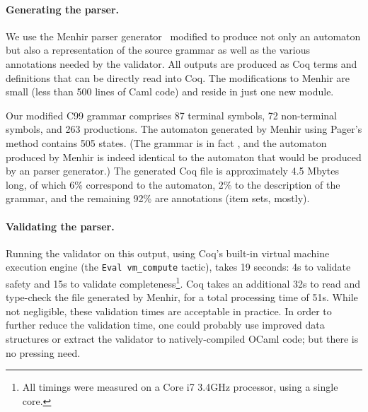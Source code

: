 \documentclass{llncs}
\begin{document}
\paragraph{Generating the parser.}  We use the Menhir parser
generator~\cite{menhir} modified to produce not only an \lrone
automaton but also a representation of the source grammar as well as
the various annotations needed by the validator.  All outputs are
produced as Coq terms and definitions that can be directly read into
Coq.  The modifications to Menhir are small (less than 500 lines of
Caml code) and reside in just one new module.

Our modified C99 grammar comprises 87 terminal symbols, 72 non-terminal
symbols, and 263 productions. The \lrone automaton generated by Menhir using
Pager's method contains 505 states. (The grammar is in fact \lalr, and the
automaton produced by Menhir is indeed identical to the \lalr automaton that
would be produced by an \lalr parser generator.) The generated Coq file is
approximately 4.5 Mbytes long, of which 6\% correspond to the automaton,
2\% to the description of the grammar, and the remaining 92\%
are annotations (item sets, mostly).

\paragraph{Validating the parser.}  Running the validator on this
output, using Coq's built-in virtual machine execution engine (the 
\verb|Eval vm_compute| tactic), takes 19 seconds: 4s to validate safety and
15s to validate completeness\footnote{All timings were measured on a Core i7
 3.4GHz processor, using a single core.}.  Coq takes an additional
32s to read and type-check the file generated by Menhir, for a total
processing time of 51s.  While not negligible, these validation times
are acceptable in practice.  In order to further reduce the validation
time, one could probably use improved data structures or extract the
validator to natively-compiled OCaml code; but there is no pressing need.


\end{document}
